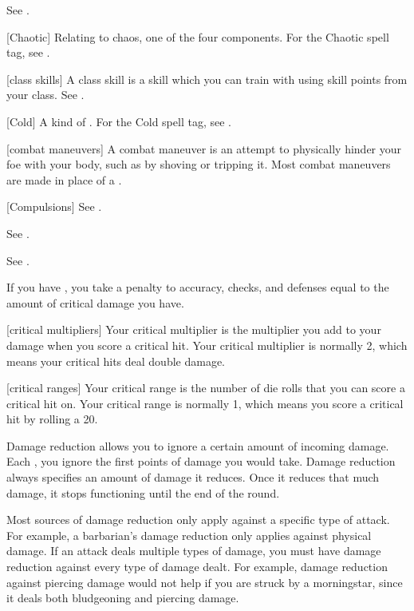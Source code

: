  See .

[Chaotic] Relating to chaos, one of the four  components. For the Chaotic spell tag, see .

[class skills] A class skill is a skill which you can train with using skill points from your class. See .

[Cold] A kind of . For the Cold spell tag, see .

[combat maneuvers] A combat maneuver is an attempt to physically hinder your foe with your body, such as by shoving or tripping it.
Most combat maneuvers are made in place of a .

[Compulsions] See .

 See .

 See .

 If you have , you take a penalty to accuracy, checks, and defenses equal to the amount of critical damage you have.

[critical multipliers] Your critical multiplier is the multiplier you add to your damage when you score a critical hit.
Your critical multiplier is normally 2, which means your critical hits deal double damage.

[critical ranges] Your critical range is the number of die rolls that you can score a critical hit on.
Your critical range is normally 1, which means you score a critical hit by rolling a 20.

 Damage reduction allows you to ignore a certain amount of incoming damage.
Each , you ignore the first points of damage you would take.
Damage reduction always specifies an amount of damage it reduces.
Once it reduces that much damage, it stops functioning until the end of the round.

Most sources of damage reduction only apply against a specific type of attack.
For example, a barbarian's damage reduction only applies against physical damage.
If an attack deals multiple types of damage, you must have damage reduction against every type of damage dealt.
For example, damage reduction against piercing damage would not help if you are struck by a morningstar, since it deals both bludgeoning and piercing damage.

